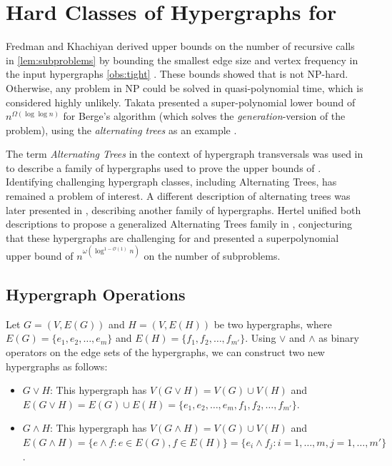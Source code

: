 \chapter{Hard Classes of Hypergraphs for \FKA}

Fredman and Khachiyan derived upper bounds on the number of recursive calls in \ref{lem:subproblems} by bounding the smallest edge size and vertex frequency in the input hypergraphs \ref{obs:tight} \cite{FK96}. These bounds showed that \TransHyp{} is not NP-hard. Otherwise, any problem in NP could be solved in quasi-polynomial time, which is considered highly unlikely. Takata presented a super-polynomial lower bound of $n^{\Omega(\log\log n)}$ for Berge's algorithm (which solves the \emph{generation}-version of the problem), using the \emph{alternating trees} as an example \cite{Tak08}.

The term \emph{Alternating Trees} in the context of hypergraph transversals was used in \cite{GK99} to describe a family of hypergraphs used to prove the upper bounds of \FKA. Identifying challenging hypergraph classes, including Alternating Trees, has remained a problem of interest. A different description of alternating trees was later presented in \cite{Tak08}, describing another family of hypergraphs. Hertel unified both descriptions to propose a generalized Alternating Trees family in \cite{Her04}, conjecturing that these hypergraphs are challenging for \FKA{} and presented a superpolynomial upper bound of $n^{\omega(\log^{1-\mathcal{O}(1)}n)}$ on the number of subproblems.

\section{Hypergraph Operations}

Let $G=(V,E(G))$ and $H=(V,E(H))$ be two hypergraphs, where $E(G)=\{e_1,e_2,\dots,e_m\}$ and $E(H)=\{f_1,f_2,\dots,f_{m'}\}$. Using $\vee$ and $\wedge$ as binary operators on the edge sets of the hypergraphs, we can construct two new hypergraphs as follows:
\begin{itemize}
\item $G\vee H$: This hypergraph has $V(G\vee H)=V(G)\cup V(H)$ and $E(G\vee H)=E(G)\cup E(H)=\{e_1,e_2,\dots,e_m,f_1,f_2,\dots,f_{m'}\}$.
\item $G\wedge H$: This hypergraph has $V(G\wedge H)=V(G)\cup V(H)$ and $E(G\wedge H)=\{e\wedge f:e\in E(G),f\in E(H)\}=\{e_i\wedge f_j:i=1,\dots,m,j=1,\dots,m'\}$.
\end{itemize}

